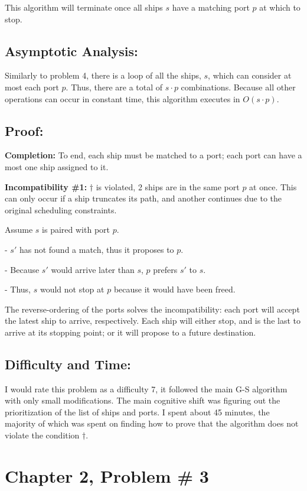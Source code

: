 \documentclass{article}
\newcommand{\tab}[1][1]{\noindent \hspace{#1cm} }
\begin{document}
\noindent This algorithm will terminate once all ships $s$ have a matching port $p$ at which to stop.

\subsection*{Asymptotic Analysis:}
Similarly to problem 4, there is a loop of all the ships, $s$, which can consider at most each port $p$.  Thus, there are a total of $s \cdot p$ combinations.  Because all other operations can occur in constant time, this algorithm executes in $O(s \cdot p)$.

\subsection*{Proof:}
\noindent \textbf{Completion:}  To end, each ship must be matched to a port; each port can have a most one ship assigned to it.

\noindent \textbf{Incompatibility \#1:}  $\dag$ is violated, 2 ships are in the same port $p$ at once.  This can only occur if a ship truncates its path, and another continues due to the original scheduling constraints.

Assume $s$ is paired with port $p$.

\tab - $s'$ has not found a match, thus it proposes to $p$.  

\tab - Because $s'$ would arrive later than $s$, $p$ prefers $s'$ to $s$.

\tab - Thus, $s$ would not stop at $p$  because it would have been freed.

The reverse-ordering of the ports solves the incompatibility:  each port will accept the latest ship to arrive, respectively.  Each ship will either stop, and is the last to arrive at its stopping point; or it will propose to a future destination.

\subsection*{Difficulty and Time:}
I would rate this problem as a difficulty 7, it followed the main G-S algorithm with only small modifications.  The main cognitive shift was figuring out the prioritization of the list of ships and ports.  I spent about 45 minutes, the majority of which was spent on finding how to prove that the algorithm does not violate the condition $\dag$.

\newpage
\section*{Chapter 2, Problem \# 3}
\end{document}
